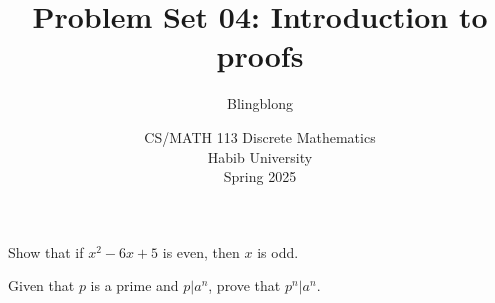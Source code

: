 \documentclass[a4paper]{exam}
\title{Problem Set 04: Introduction to proofs}
\author{Blingblong} %
\date{CS/MATH 113 Discrete Mathematics\\Habib University\\Spring 2025}
\begin{document}
\maketitle



\begin{questions}

    \question[5] Show that if $x^{2} - 6x + 5$ is even, then $x$ is odd.
    \begin{solution}
    \end{solution}

    \question[5] Given that $p$ is a prime and $p|a^n$, prove that $p^n|a^n$. 
    \begin{solution}
    \end{solution}


    
\end{questions}
\end{document}
